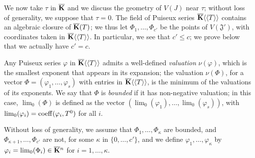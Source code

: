 \documentclass[12pt]{article}
\begin{document}
We now take $\tau$ in $\overline{\mathbf{K}}$ and we discuss the geometry of $V(J)$
near $\tau$; without loss of generality, we suppose that $\tau=0$.
The field of Puiseux series $\overline{\mathbf{K}}\langle\langle T \rangle\rangle$
contains an algebraic closure of $\overline{\mathbf{K}}(T)$; we thus let
$\Phi_1,\dots,\Phi_{c'}$ be the points of $V(\mathfrak{J}')$, with
coordinates taken in $\overline{\mathbf{K}}\langle\langle T \rangle\rangle$. In
particular, we see that $c' \le c$; we prove below that we actually
have $c'=c$.

Any Puiseux series $\varphi$ in $\overline{\mathbf{K}}\langle\langle T
\rangle\rangle$ admits a well-defined {\em valuation} $\nu(\varphi)$,
which is the smallest exponent that appears in its expansion; the
valuation $\nu(\Phi)$, for a vector $\Phi=(\varphi_1,\dots,\varphi_s)$
with entries in $\overline{\mathbf{K}}\langle\langle T \rangle\rangle$, is the
minimum of the valuations of its exponents. We say that $\Phi$ is {\em
  bounded} if it has non-negative valuation; in this case,
$\lim_0(\Phi)$ is defined as the vector
$(\lim_0(\varphi_1),\dots,\lim_0(\varphi_s))$, with
$\lim_0(\varphi_i)={\rm coeff}(\varphi_i,T^0)$ for all $i$.

Without loss of generality, we assume that
$\Phi_1,\dots,\Phi_\kappa$ are bounded, and
$\Phi_{\kappa+1},\dots,\Phi_{c'}$ are not, for some $\kappa$ in
$\{0,\dots,c'\}$, and we define $\varphi_1,\dots,\varphi_\kappa$ by
$\varphi_i=\lim_0(\Phi_i)\in\overline{\mathbf{K}}{}^n$ for
$i=1,\dots,\kappa$.
\end{document}
